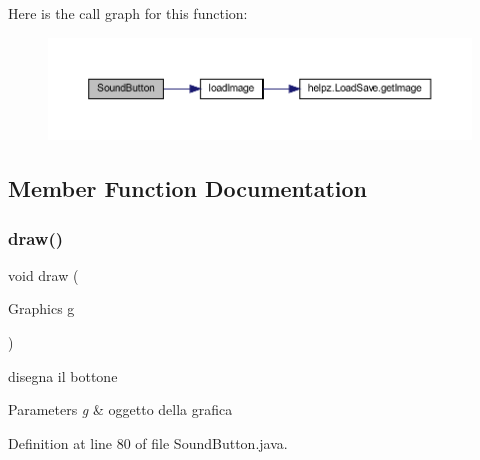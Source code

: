 Here is the call graph for this function\+:\nopagebreak
\begin{figure}[H]
\begin{center}
\leavevmode
\includegraphics[width=350pt]{classui_1_1_sound_button_a08aaedca13e6e5245ebf8ad14a2eeeaa_cgraph}
\end{center}
\end{figure}


\subsection{Member Function Documentation}
\mbox{\label{classui_1_1_sound_button_a72fe1ffca978e99fd16994a10e7f8051}} 
\subsubsection{\texorpdfstring{draw()}{draw()}}
{\footnotesize\ttfamily void draw (\begin{DoxyParamCaption}\item[{Graphics}]{g }\end{DoxyParamCaption})}



disegna il bottone 


\begin{DoxyParams}{Parameters}
{\em g} & oggetto della grafica \\
\hline
\end{DoxyParams}


Definition at line 80 of file Sound\+Button.\+java.

